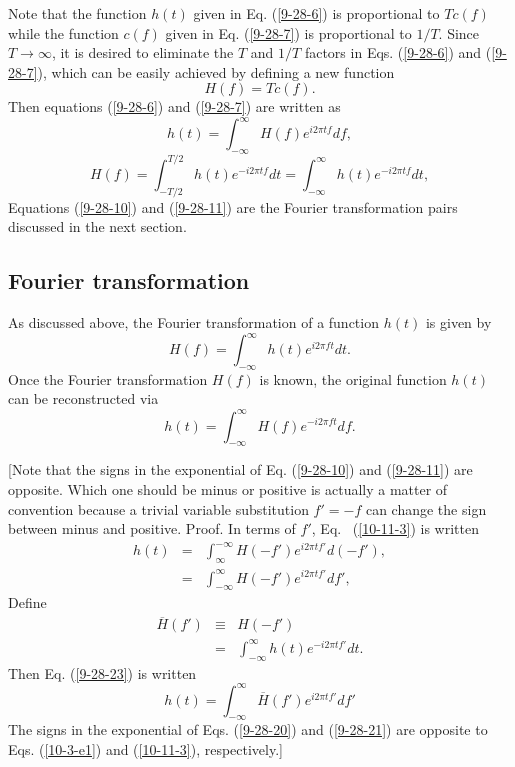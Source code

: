 \documentclass{article}
\begin{document}
Note that the function $h (t)$ given in Eq. (\ref{9-28-6}) is proportional to
$T c (f)$ while the function $c (f)$ given in Eq. (\ref{9-28-7}) is
proportional to $1 / T$. Since $T \rightarrow \infty$, it is desired to
eliminate the $T$ and $1 / T$ factors in Eqs. (\ref{9-28-6}) and
(\ref{9-28-7}), which can be easily achieved by defining a new function
\begin{equation}
  H (f) = T c (f) .
\end{equation}
Then equations (\ref{9-28-6}) and (\ref{9-28-7}) are written as
\begin{equation}
  \label{9-28-10} h (t) = \int_{- \infty}^{\infty} H (f) e^{i 2 \pi t f} d f,
\end{equation}
\begin{equation}
  \label{9-28-11} H (f) = \int_{- T / 2}^{T / 2} h (t) e^{- i 2 \pi t f} d t =
  \int_{- \infty}^{\infty} h (t) e^{- i 2 \pi t f} d t,
\end{equation}
Equations (\ref{9-28-10}) and (\ref{9-28-11}) are the Fourier transformation
pairs discussed in the next section.

\subsection{Fourier transformation}

As discussed above, the Fourier transformation of a function $h (t)$ is given
by
\begin{equation}
  \label{10-3-e1} H (f) = \int_{- \infty}^{\infty} h (t) e^{i 2 \pi f t} d t.
\end{equation}
Once the Fourier transformation $H (f)$ is known, the original function $h
(t)$ can be reconstructed via
\begin{equation}
  \label{10-11-3} h (t) = \int_{- \infty}^{\infty} H (f) e^{- i 2 \pi f t} d
  f.
\end{equation}


[Note that the signs in the exponential of Eq. (\ref{9-28-10}) and
(\ref{9-28-11}) are opposite. Which one should be minus or positive is
actually a matter of convention because a trivial variable substitution $f' =
- f$ can change the sign between minus and positive. Proof. In terms of $f'$,
Eq. \ (\ref{10-11-3}) is written
\begin{eqnarray}
  h (t) & = & \int_{\infty}^{- \infty} H (- f') e^{i 2 \pi t f'} d (- f'),
  \nonumber\\
  & = & \int_{- \infty}^{\infty} H (- f') e^{i 2 \pi t f'} d f', 
  \label{9-28-23}
\end{eqnarray}
Define
\begin{eqnarray}
  \overline{H} (f') & \equiv & H (- f') \nonumber\\
  & = & \int_{- \infty}^{\infty} h (t) e^{- i 2 \pi t f'} d t. 
  \label{9-28-20}
\end{eqnarray}
Then Eq. (\ref{9-28-23}) is written
\begin{equation}
  \label{9-28-21} h (t) = \int_{- \infty}^{\infty} \overline{H} (f') e^{i 2
  \pi t f'} d f'
\end{equation}
The signs in the exponential of Eqs. (\ref{9-28-20}) and (\ref{9-28-21}) are
opposite to Eqs. (\ref{10-3-e1}) and (\ref{10-11-3}), respectively.]
\end{document}
